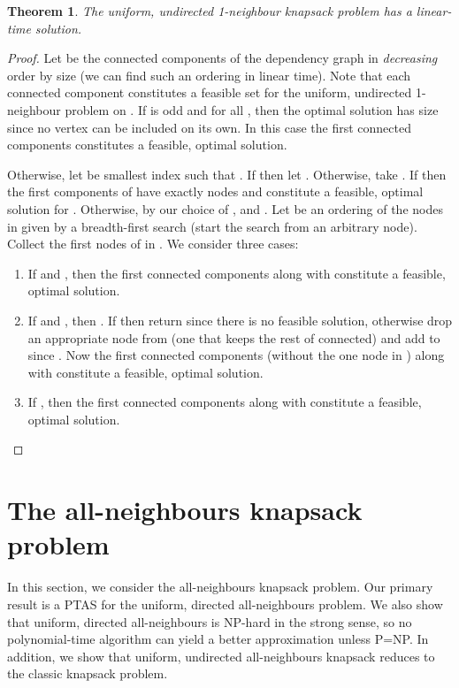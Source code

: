 \documentclass[12pt]{article}
\newtheorem{theorem}{Theorem}
\begin{document}
\begin{theorem} \label{thm:uu1n}
The uniform, undirected 1-neighbour knapsack problem has a linear-time solution.
\end{theorem}




\begin{proof}
Let  be the connected components of the dependency graph
 in {\em decreasing} order by size (we can find such an ordering in linear time).  Note that each connected
component  constitutes a feasible set for the
uniform, undirected 1-neighbour problem on .  If  is odd and
 for all , then the optimal solution has size  since no vertex can
be included on its own.  In this case the first  connected
components constitutes a feasible, optimal solution.

Otherwise, let  be smallest index such that .  If  then
let .  Otherwise, take .  If  then the first 
components of  have exactly  nodes and constitute a feasible,
optimal solution for .  Otherwise, by our choice of ,
 and .  Let  be an ordering of the nodes in
 given by a breadth-first search (start the search
from an arbitrary node).  Collect the first  nodes of  in .  We consider three cases:
\begin{enumerate}
\item If  and , then the first 
connected components along with  constitute a
feasible, optimal solution.
\item If  and , then .  If  then return
 since there is no feasible solution, otherwise drop an
appropriate node from  (one that keeps the rest of
 connected) and add  to  since
.  Now the first  connected components
(without the one node in ) along with 
constitute a feasible, optimal solution.
\item If , then the
first  connected components along with  constitute a
feasible, optimal solution.
\end{enumerate}
\end{proof}







\section{The all-neighbours knapsack problem} \label{sec:all-neighbours}

In this section, we consider the all-neighbours knapsack problem.  Our
primary result is a PTAS for the uniform, directed all-neighbours
problem.  We also show that uniform, directed all-neighbours is
NP-hard in the strong sense, so no polynomial-time algorithm can yield
a better approximation unless P=NP.  In addition, we show that
uniform, undirected all-neighbours knapsack reduces to the classic
knapsack
problem.
\end{document}
